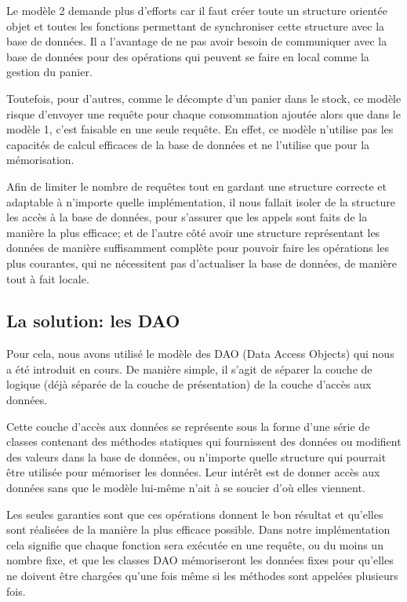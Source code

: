 \documentclass[a4paper,10pt]{article}
\begin{document}
Le modèle 2 demande plus d'efforts car il faut créer toute un structure orientée objet et toutes les fonctions permettant de synchroniser cette structure avec la base de données. Il a l'avantage de ne pas avoir besoin de communiquer avec la base de données pour des opérations qui peuvent se faire en local comme la gestion du panier.

Toutefois, pour d'autres, comme le décompte d'un panier dans le stock, ce modèle risque d'envoyer une requête pour chaque consommation ajoutée alors que dans le modèle 1, c'est faisable en une seule requête. En effet, ce modèle n'utilise pas les capacités de calcul efficaces de la base de données et ne l'utilise que pour la mémorisation.

Afin de limiter le nombre de requêtes tout en gardant une structure correcte et adaptable à n'importe quelle implémentation, il nous fallait isoler de la structure les accès à la base de données, pour s'assurer que les appels sont faits de la manière la plus efficace; et de l'autre côté avoir une structure représentant les données de manière suffisamment complète pour pouvoir faire les opérations les plus courantes, qui ne nécessitent pas d'actualiser la base de données, de manière tout à fait locale.

\subsection{La solution: les DAO}

Pour cela, nous avons utilisé le modèle des DAO (Data Access Objects) qui nous a été introduit en cours. De manière simple, il s'agit de séparer la couche de logique (déjà séparée de la couche de présentation) de la couche d'accès aux données.

Cette couche d'accès aux données se représente sous la forme d'une série de classes contenant des méthodes statiques qui fournissent des données ou modifient des valeurs dans la base de données, ou n'importe quelle structure qui pourrait être utilisée pour mémoriser les données. Leur intérêt est de donner accès aux données sans que le modèle lui-même n'ait à se soucier d'où elles viennent.

Les seules garanties sont que ces opérations donnent le bon résultat et qu'elles sont réalisées de la manière la plus efficace possible.
Dans notre implémentation cela signifie que chaque fonction sera exécutée en une requête, ou du moins un nombre fixe, et que les classes DAO mémoriseront les données fixes pour qu'elles ne doivent être chargées qu'une fois même si les méthodes sont appelées plusieurs fois.
\end{document}
